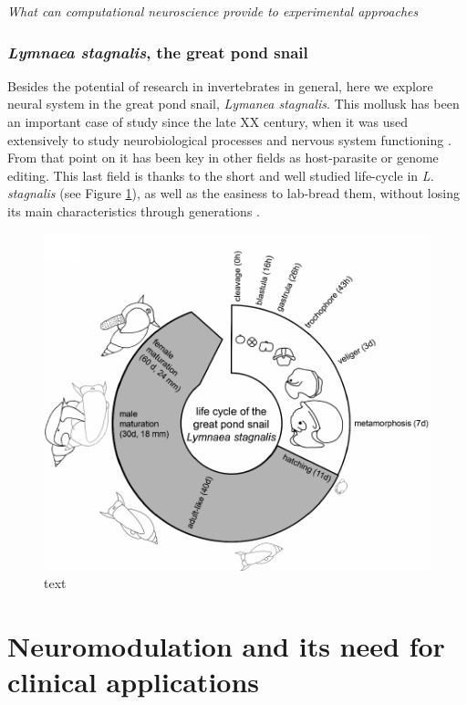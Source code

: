 \textit{What can computational neuroscience provide to experimental approaches}



\subsubsection{\textit{Lymnaea stagnalis}, the great pond snail}
Besides the potential of research in invertebrates in general, here we explore neural system in the great pond snail, \textit{Lymanea stagnalis}. This mollusk has been an important case of study since the late XX century, when it was used extensively to study neurobiological processes and nervous system functioning \parencite{Benjamin1979a}. %
From that point on it has been key in other fields as host-parasite or genome editing. This last field is thanks to the short and well studied life-cycle in \textit{L. stagnalis} (see Figure \ref{fig:lymnaea_life_cycle}), as well as the easiness to lab-bread them, without losing its main characteristics through generations \parencite{noland_observations_1946}. 


\begin{figure}[htb!]
	\includegraphics[width=\textwidth]{img/intro/lymnaea_life_cycle.pdf}
	\caption{text}
	\label{fig:lymnaea_life_cycle}
\end{figure}




\section{Neuromodulation and its need for clinical applications}